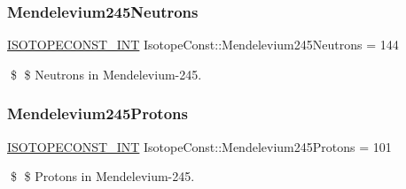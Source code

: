\subsubsection{\texorpdfstring{Mendelevium245\+Neutrons}{Mendelevium245Neutrons}}
{\footnotesize\ttfamily \mbox{\hyperlink{group___isotope_const-_macros_ga5f18360b3e99483a35c32d789e62621c}{I\+S\+O\+T\+O\+P\+E\+C\+O\+N\+S\+T\+\_\+\+I\+NT}} Isotope\+Const\+::\+Mendelevium245\+Neutrons = 144}

\$ \$ Neutrons in Mendelevium-\/245. \mbox{\label{group___isotope_const-_mendelevium-_md245_ga973fd4597419b4811d2b14048e3ec661}} 
\subsubsection{\texorpdfstring{Mendelevium245\+Protons}{Mendelevium245Protons}}
{\footnotesize\ttfamily \mbox{\hyperlink{group___isotope_const-_macros_ga5f18360b3e99483a35c32d789e62621c}{I\+S\+O\+T\+O\+P\+E\+C\+O\+N\+S\+T\+\_\+\+I\+NT}} Isotope\+Const\+::\+Mendelevium245\+Protons = 101}

\$ \$ Protons in Mendelevium-\/245. 